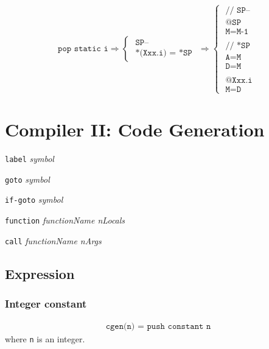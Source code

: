 \documentclass[a4paper]{book}
\begin{document}
\[
    \texttt{pop static i}
    \Rightarrow
    \begin{cases}
        \texttt{ SP--            } \\
        \texttt{ *(Xxx.i) = *SP }
    \end{cases}
    \Rightarrow
    \begin{cases}
        \texttt{ // SP-- } \\
        \texttt{ @SP     } \\
        \texttt{ M=M-1   } \\
        \\
        \texttt{ // *SP  } \\
        \texttt{ A=M     } \\
        \texttt{ D=M     } \\
        \\
        \texttt{ @Xxx.i  } \\
        \texttt{ M=D     }
    \end{cases}
\]

\setcounter{chapter}{10}
\chapter{Compiler II: Code Generation}

\texttt{label} \textit{symbol}

\texttt{goto} \textit{symbol}

\texttt{if-goto} \textit{symbol}

\texttt{function} \textit{functionName nLocals}

\texttt{call} \textit{functionName nArgs}




\section*{Expression}

\subsection*{Integer constant}
\begin{align*}
    \texttt{cgen(n) = push constant n}
\end{align*}
where \texttt{n} is an integer.
\end{document}
